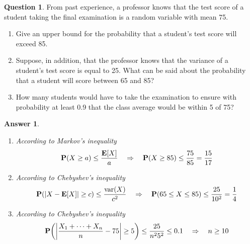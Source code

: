 \documentclass[utf8]{article}
\theoremstyle{definition}%
\newtheorem{question}{Question} %
\theoremstyle{plain}%
\newtheorem{answer}{Answer} %
\begin{document}
\begin{question}
    From past experience, a professor knows that the test score of a student taking the final examination is a random variable with mean 75.
    \begin{enumerate}[label=(\alph*)]
        \item Give an upper bound for the probability that a student's test score will exceed 85.
        \item Suppose, in addition, that the professor knows that the variance of a student's test score is equal to 25.  What can be said about the probability that a student will score between 65 and 85?
        \item How many students would have to take the examination to ensure with probability at least 0.9 that the class average would be within 5 of 75?
    \end{enumerate}
\end{question}
\begin{answer} ~
    \begin{enumerate}[label=(\alph*)]
        \item According to Markov's inequality
        \begin{equation}
            \mathbf{P}(X \geq a) \leq \frac{\mathbf{E}[X]}{a} \quad\Rightarrow\quad \mathbf{P}(X \geq 85) \leq \frac{75}{85} = \frac{15}{17}
        \end{equation}
        \item According to Chebyshev's inequality
        \begin{equation}
            \mathbf{P}(\abs{X - \mathbf{E}[X]} \geq c) \leq \frac{\mathrm{var}(X)}{c^2} \quad\Rightarrow\quad \mathbf{P}(65 \leq X \leq 85) \leq \frac{25}{10^2} = \frac{1}{4}
        \end{equation}
        \item According to Chebyshev's inequality
        \begin{equation}
            \mathbf{P}\qty(\abs{\frac{X_1 + \cdots + X_n}{n} - 75} \geq 5) \leq \frac{25}{n^2 5^2} \leq 0.1 \quad\Rightarrow\quad n \geq 10
        \end{equation}
    \end{enumerate}
\end{answer}
\end{document}
